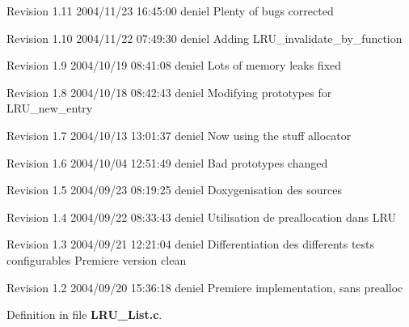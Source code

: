 Revision 1.11 2004/11/23 16:45:00 deniel Plenty of bugs corrected

Revision 1.10 2004/11/22 07:49:30 deniel Adding LRU\_\-invalidate\_\-by\_\-function

Revision 1.9 2004/10/19 08:41:08 deniel Lots of memory leaks fixed

Revision 1.8 2004/10/18 08:42:43 deniel Modifying prototypes for LRU\_\-new\_\-entry

Revision 1.7 2004/10/13 13:01:37 deniel Now using the stuff allocator

Revision 1.6 2004/10/04 12:51:49 deniel Bad prototypes changed

Revision 1.5 2004/09/23 08:19:25 deniel Doxygenisation des sources

Revision 1.4 2004/09/22 08:33:43 deniel Utilisation de preallocation dans LRU

Revision 1.3 2004/09/21 12:21:04 deniel Differentiation des differents tests configurables Premiere version clean

Revision 1.2 2004/09/20 15:36:18 deniel Premiere implementation, sans prealloc

Definition in file {\bf LRU\_\-List.c}.